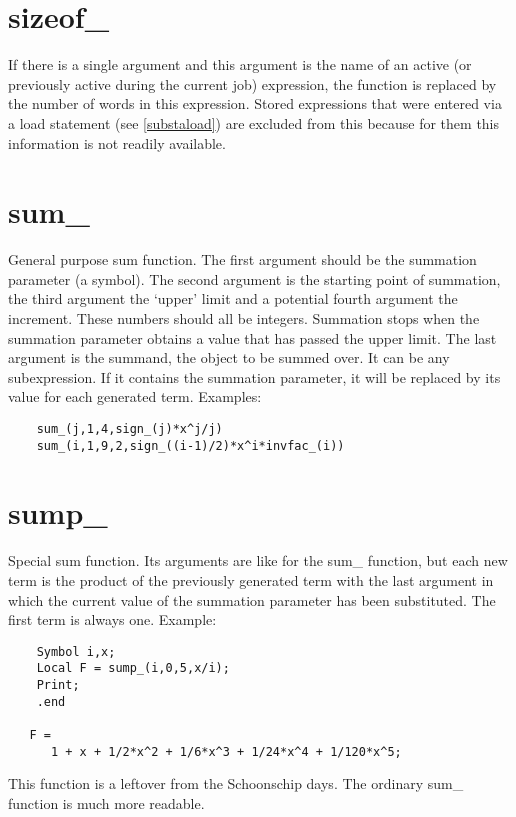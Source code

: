 
\section{sizeof\_}
\label{funsizeof}
\noindent If there is a single argument and this argument is the name of an 
active (or previously active during the current job) expression, the 
function is replaced by the number of \FORM 
words in this expression. Stored expressions that were entered via a load 
statement (see \ref{substaload}) are excluded from this because for them 
this information is not readily available.


\section{sum\_}
\label{funsum}
\noindent General purpose sum function. The first argument should 
be the summation parameter (a symbol). The second argument is the starting 
point of summation, the third argument the `upper' limit and a potential 
fourth argument the increment. These numbers should all be integers. 
Summation stops when the summation parameter obtains a value that has 
passed the upper limit. The last argument is the summand, the object to be 
summed over. It can be any subexpression. If it contains the summation 
parameter, it will be replaced by its value for each generated term. 
Examples:
\begin{verbatim}
    sum_(j,1,4,sign_(j)*x^j/j)
    sum_(i,1,9,2,sign_((i-1)/2)*x^i*invfac_(i))
\end{verbatim}


\section{sump\_}
\label{funsump}
\noindent Special sum function. Its arguments are like for the 
sum\_ function, but each new term is the product of the previously 
generated term with the last argument in which the current value of the 
summation parameter has been substituted. The first term is always one. 
Example:
\begin{verbatim}
    Symbol i,x;
    Local F = sump_(i,0,5,x/i);
    Print;
    .end

   F =
      1 + x + 1/2*x^2 + 1/6*x^3 + 1/24*x^4 + 1/120*x^5;
\end{verbatim}
This function is a leftover from the Schoonschip days. 
The ordinary sum\_ function is much more readable.

